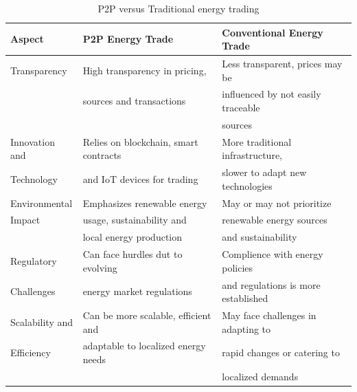 \begin{table}[h!]
    \begin{tabular}[rounded-corners]{l|ll}
        \textbf{Aspect} & \textbf{P2P Energy Trade}             & \textbf{Conventional Energy Trade}  \\
        \hline
        Transparency    & High transparency in pricing,         & Less transparent, prices may be     \\
                        & sources and transactions              & influenced by not easily traceable  \\
                        &                                       & sources                             \\[5pt]
        Innovation and  & Relies on blockchain, smart contracts & More traditional infrastructure,    \\
        Technology      & and IoT devices for trading           & slower to adapt new technologies    \\ [5pt]
        Environmental   & Emphasizes renewable energy           & May or may not prioritize           \\
        Impact          & usage, sustainability and             & renewable energy sources            \\
                        & local energy production               & and sustainability                  \\[5pt]
        Regulatory      & Can face hurdles dut to evolving      & Complience with energy policies     \\
        Challenges      & energy market regulations             & and regulations is more established \\[5pt]
        Scalability and & Can be more scalable, efficient and   & May face challenges in adapting to  \\
        Efficiency      & adaptable to localized energy needs   & rapid changes or catering to        \\
                        &                                       & localized demands                   \\[5pt]
    \end{tabular}
    \caption{P2P versus Traditional energy trading}
\end{table}

